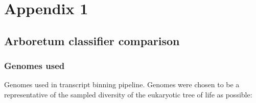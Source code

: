 \graphicspath{{appendices/appendix_1/figures}}
\chapter{Appendix 1}

\section{Arboretum classifier comparison}

\subsection{Genomes used}\label{sec:appen_genomes}

Genomes used in transcript binning pipeline.
Genomes were chosen to be a representative of the sampled diversity of the 
eukaryotic tree of life as possible:
